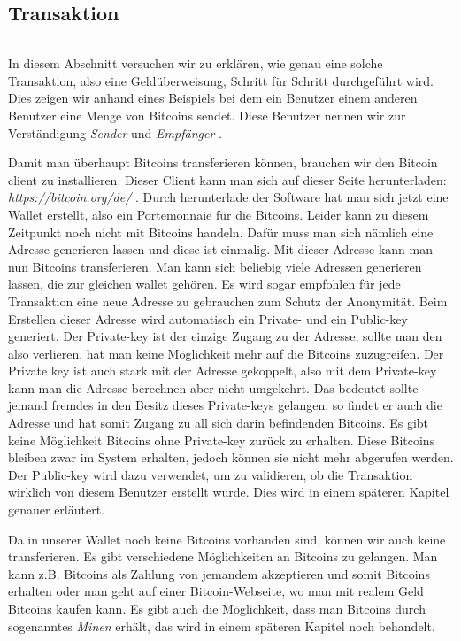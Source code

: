 \vspace*{1mm}
\subsection*{Transaktion}
\vspace{-10mm}
\noindent\rule{0.8\textwidth}{0.4pt}

\vspace{5mm}

\noindent
In diesem Abschnitt versuchen wir zu erklären, wie genau eine solche Transaktion, also eine Geldüberweisung, Schritt für Schritt durchgeführt wird.
Dies zeigen wir anhand eines Beispiels bei dem ein Benutzer einem anderen Benutzer eine Menge von Bitcoins sendet. Diese Benutzer nennen wir zur Verständigung
\emph{\dq Sender \dq} und \emph{\dq Empfänger \dq}.

\noindent
Damit man überhaupt Bitcoins transferieren können, brauchen wir den Bitcoin client zu installieren. Dieser Client kann man sich auf dieser Seite herunterladen: \emph{\dq https://bitcoin.org/de/ \dq}.
Durch herunterlade der Software hat man sich jetzt eine Wallet erstellt, also ein Portemonnaie für die Bitcoins. Leider kann zu diesem Zeitpunkt noch nicht mit Bitcoins handeln.
Dafür muss man sich nämlich eine Adresse generieren lassen und diese ist einmalig. Mit dieser Adresse kann man nun Bitcoins transferieren.
Man kann sich beliebig viele Adressen generieren lassen, die zur gleichen wallet gehören. Es wird sogar empfohlen für jede Transaktion eine neue Adresse zu gebrauchen zum Schutz der Anonymität.
Beim Erstellen dieser Adresse wird automatisch ein Private- und ein Public-key generiert. Der Private-key ist der einzige Zugang zu der Adresse, sollte man den also verlieren, hat man keine Möglichkeit mehr
auf die Bitcoins zuzugreifen. Der Private key ist auch stark mit der Adresse gekoppelt, also mit dem Private-key kann man die Adresse berechnen aber nicht umgekehrt. Das bedeutet sollte jemand fremdes in den
Besitz dieses Private-keys gelangen, so findet er auch die Adresse und hat somit Zugang zu all sich darin befindenden Bitcoins. Es gibt keine Möglichkeit Bitcoins ohne Private-key zurück zu erhalten.
Diese Bitcoins bleiben zwar im System erhalten, jedoch können sie nicht mehr abgerufen werden. Der Public-key wird dazu verwendet, um zu validieren, ob die Transaktion wirklich von diesem Benutzer
erstellt wurde. Dies wird in einem späteren Kapitel genauer erläutert.

\noindent
Da in unserer Wallet noch keine Bitcoins vorhanden sind, können wir auch keine transferieren. Es gibt verschiedene Möglichkeiten an Bitcoins zu gelangen.
Man kann z.B. Bitcoins als Zahlung von jemandem akzeptieren und somit Bitcoins erhalten oder man geht auf einer Bitcoin-Webseite, wo man mit realem Geld Bitcoins kaufen kann.
Es gibt auch die Möglichkeit, dass man Bitcoins durch sogenanntes \emph{\dq Minen \dq} erhält, das wird in einem späteren Kapitel noch behandelt.

